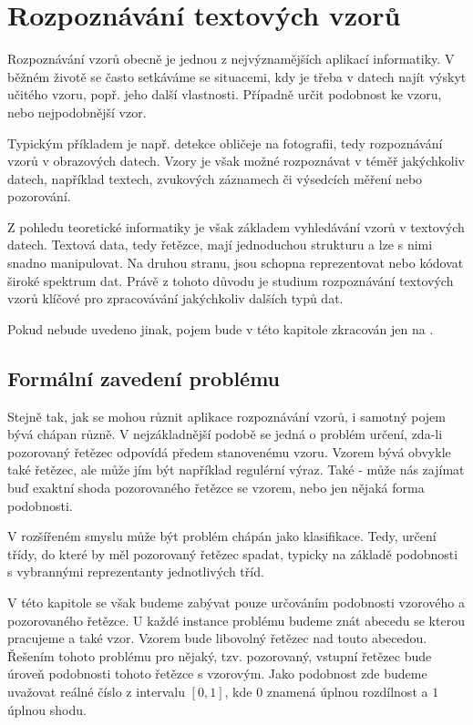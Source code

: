 \documentclass[a4paper,10pt]{article}
\begin{document}
\section{Rozpoznávání textových vzorů}

Rozpoznávání vzorů obecně je jednou z nejvýznamějších aplikací informatiky. V běžném životě se často setkáváme se situacemi, kdy je třeba v datech najít výskyt učitého vzoru, popř. jeho další vlastnosti. Případně určit podobnost ke vzoru, nebo nejpodobnější vzor.

Typickým příkladem je např. detekce obličeje na fotografii, tedy rozpoznávání vzorů v obrazových datech. Vzory je však možné rozpoznávat v téměř jakýchkoliv datech, například textech, zvukových záznamech či výsedcích měření nebo pozorování.

Z pohledu teoretické informatiky je však základem vyhledávání vzorů v textových datech. Textová data, tedy řetězce, mají jednoduchou strukturu a lze s nimi snadno manipulovat. Na druhou stranu, jsou schopna reprezentovat nebo kódovat široké spektrum dat. Právě z tohoto důvodu je studium rozpoznávání textových vzorů klíčové pro zpracovávání jakýchkoliv dalších typů dat.

\begin{note}
 Pokud nebude uvedeno jinak, pojem  bude v této kapitole zkracován jen na .
\end{note}

\subsection{Formální zavedení problému}
Stejně tak, jak se mohou různit aplikace rozpoznávání vzorů, i samotný pojem  bývá chápan různě. V nejzákladnější podobě se jedná o problém určení, zda-li pozorovaný řetězec odpovídá předem stanovenému vzoru. Vzorem bývá obvykle také řetězec, ale může jím být například regulérní výraz. Také - může nás zajímat buď exaktní shoda pozorovaného řetězce se vzorem, nebo jen nějaká forma podobnosti. 

V rozšířeném smyslu může být problém chápán jako klasifikace. Tedy, určení třídy, do které by měl pozorovaný řetězec spadat, typicky na základě podobnosti s vybrannými reprezentanty jednotlivých tříd. 

V této kapitole se však budeme zabývat pouze určováním podobnosti vzorového a pozorovaného řetězce. U každé instance problému budeme znát abecedu se kterou pracujeme a také vzor. Vzorem bude libovolný řetězec nad touto abecedou. Řešením tohoto problému pro nějaký, tzv. pozorovaný, vstupní řetězec bude úroveň podobnosti tohoto řetězce s vzorovým. Jako podobnost zde budeme uvažovat reálné číslo z intervalu $[0, 1]$, kde $0$ znamená úplnou rozdílnost a $1$ úplnou shodu. 
\end{document}
